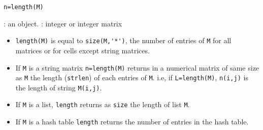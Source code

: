 
\begin{mandesc}
\end{mandesc}
\begin{calling_sequence}
\begin{verbatim}
n=length(M)   
\end{verbatim}
\end{calling_sequence}

\begin{parameters}
  \begin{varlist}
    : an object.
    : integer or integer matrix
  \end{varlist}
\end{parameters}

\begin{mandescription}
\begin{itemize}
  \item \verb!length(M)! is equal to \verb!size(M,'*')!, the number of entries of \verb!M! for all matrices 
    or for cells except string matrices.
  \item If \verb+M+ is a string matrix \verb+n=length(M)+ returns in a  numerical matrix of same size 
    as \verb+M+ the length (\verb+strlen+) of each entries of \verb+M+. i.e, if \verb+L=length(M)+, 
    \verb+n(i,j)+ is the length of string \verb+M(i,j)+.
  \item If \verb+M+ is a list, \verb+length+ returns as \verb+size+ the length of list \verb+M+.
  \item If \verb+M+ is a hash table \verb+length+ returns the number of entries in the hash table.
\end{itemize}
\end{mandescription}

\begin{examples}
  \begin{program}
  \end{program}
\end{examples}

\begin{manseealso}
\end{manseealso}

